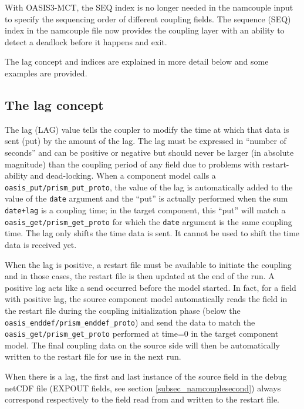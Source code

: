 With OASIS3-MCT, the SEQ index is no longer needed in the namcouple
input to specify the sequencing order of different coupling fields.
The sequence (SEQ) index in the namcouple file now provides the coupling 
layer with an ability to detect a deadlock before it happens and exit.

The lag concept and indices are explained in more detail below and some
examples are provided.

\subsection{The lag concept}
\label{subsub_lag}

The lag (LAG) value tells the coupler to modify the time at which that data
is sent (put) by the amount of the lag.  The lag must be
expressed in ``number of seconds'' and can be positive or
negative but should never be larger (in absolute magnitude) than the
coupling period of any field due to problems with restart-ability and
dead-locking. When a component model calls a {\tt oasis\_put/prism\_put\_proto}, the value of the lag is automatically added to the value of the {\tt date} argument and the ``put'' is actually performed when the sum {\tt date+lag} is a coupling time; in the target component, this ``put'' will match a {\tt oasis\_get/prism\_get\_proto} for which the {\tt date} argument is the same coupling time.
The lag only shifts the time data is sent.  It cannot be used to shift the time data is received yet.
 
When the lag is positive, a restart file must be available to initiate the coupling and in those cases, the restart file is then updated at the end of the run.  A positive lag acts like a send occurred before the model started. In fact, for a field with positive lag, the source component model automatically reads the field in the restart file during the coupling initialization phase (below the {\tt oasis\_enddef/prism\_enddef\_proto}) and send the data to match the {\tt oasis\_get/prism\_get\_proto} performed at time=0 in the target component model. The final coupling
data on the source side will then be automatically written to the restart file for use in the next run.  

When there is a lag, the first and last instance of the source field
in the debug netCDF file (EXPOUT fields, see section
\ref{subsec_namcouplesecond}) always correspond respectively to the field read from and written to the restart file.
 
